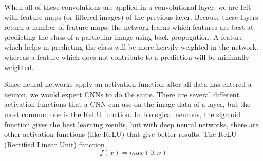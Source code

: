 \documentclass[12pt]{article} %
\begin{document}
	When all of these convolutions are applied in a convolutional layer, we are left with feature maps (or filtered images) of the previous layer. Because these layers return a number of feature maps, the network learns which features are best at predicting the class of a particular image using back-propogation. A feature which helps in predicting the class will be more heavily weighted in the network. whereas a feature which does not contribute to a prediction will be minimally weighted.
	
	Since neural networks apply an activation function after all data has entered a neuron, we would expect CNNs to do the same. There are several different activation functions that a CNN can use on the image data of a layer, but the most common one is the ReLU function. In biological neurons, the sigmoid function gives the best learning results, but with deep neural networks, there are other activation functions (like ReLU) that give better results. The ReLU (Rectified Linear Unit) function \cite{krizhevsky2012imagenet}	
\[f(x) = max(0, x)\]

	
\end{document}
